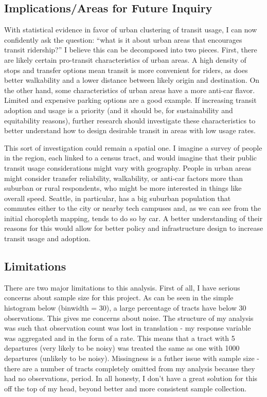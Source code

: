 \documentclass[
]{article}
\begin{document}
\subsection{Implications/Areas for Future
Inquiry}\label{implicationsareas-for-future-inquiry}

With statistical evidence in favor of urban clustering of transit usage,
I can now confidently ask the question: ``what is it about urban areas
that encourages transit ridership?'' I believe this can be decomposed
into two pieces. First, there are likely certain pro-transit
characteristics of urban areas. A high density of stops and transfer
options mean transit is more convenient for riders, as does better
walkability and a lower distance between likely origin and destination.
On the other hand, some characteristics of urban areas have a more
anti-car flavor. Limited and expensive parking options are a good
example. If increasing transit adoption and usage is a priority (and it
should be, for sustainability and equitability reasons), further
research should investigate these characteristics to better understand
how to design desirable transit in areas with low usage rates.

This sort of investigation could remain a spatial one. I imagine a
survey of people in the region, each linked to a census tract, and would
imagine that their public transit usage considerations might vary with
geography. People in urban areas might consider transfer reliability,
walkability, or anti-car factors more than suburban or rural
respondents, who might be more interested in things like overall speed.
Seattle, in particular, has a big suburban population that commutes
either to the city or nearby tech campuses and, as we can see from the
initial choropleth mapping, tends to do so by car. A better
understanding of their reasons for this would allow for better policy
and infrastructure design to increase transit usage and adoption.

\subsection{Limitations}\label{limitations}

There are two major limitations to this analysis. First of all, I have
serious concerns about sample size for this project. As can be seen in
the simple histogram below (binwidth = 30), a large percentage of tracts
have below 30 observations. This gives me concerns about noise. The
structure of my analysis was such that observation count was lost in
translation - my response variable was aggregated and in the form of a
rate. This means that a tract with 5 departures (very likely to be
noisy) was treated the same as one with 1000 departures (unlikely to be
noisy). Missingness is a futher issue with sample size - there are a
number of tracts completely omitted from my analysis because they had no
observations, period. In all honesty, I don't have a great solution for
this off the top of my head, beyond better and more consistent sample
collection.
\end{document}
